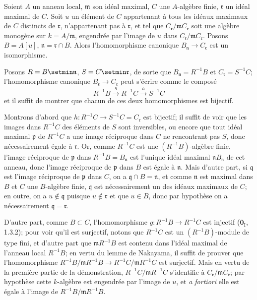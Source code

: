 \begin{lemma}[18.4.6.1]
\label{IV.18.4.6.1}
Soient $A$ un anneau local, $\mathfrak m$ son idéal maximal, $C$ une $A$-algèbre finie, $\mathfrak r$ un idéal maximal de $C$. Soit $u$ un élément de $C$ appartenant à tous les idéaux maximaux de $C$ distincts de $\mathfrak r$, n'appartenant pas à $\mathfrak r$, et tel que $C_{\mathfrak r}/\mathfrak mC_{\mathfrak r}$ soit une algèbre monogène sur $k=A/\mathfrak m$, engendrée par l'image de $u$ dans $C_{\mathfrak r}/\mathfrak mC_{\mathfrak r}$. Posons $B=A[u]$, $\mathfrak n=\mathfrak r\cap B$. Alors l'homomorphisme canonique $B_{\mathfrak n}\to C_{\mathfrak r}$ est un isomorphisme.
\end{lemma}

Posons $R=B\setmin\mathfrak n$, $S=C\setmin\mathfrak r$, de sorte que $B_{\mathfrak n}=R^{-1}B$ et $C_{\mathfrak r}=S^{-1}C$; l'homomorphisme canonique $B_{\mathfrak r}\to C_{\mathfrak r}$ peut s'écrire comme le composé
\[
  R^{-1}B\xrightarrow{g}R^{-1}C\xrightarrow{h}S^{-1}C
\]
et il suffit de montrer que chacun de ces deux homomorphismes est bijectif.

Montrons d'abord que $h:R^{-1}C\to S^{-1}C=C_{\mathfrak r}$ est bijectif; il suffit de voir que les images dans $R^{-1}C$ des éléments de $S$ sont inversibles, ou encore que tout idéal maximal $\mathfrak p$ de $R^{-1}C$ a une image réciproque dans $C$ ne rencontrant pas $S$, donc nécessairement égale à $\mathfrak r$. Or, comme $R^{-1}C$ est une $(R^{-1}B)$-algèbre finie, l'image réciproque de $\mathfrak p$ dans
$R^{-1}B=B_{\mathfrak n}$ est l'unique idéal maximal $\mathfrak nB_{\mathfrak n}$ de cet anneau, donc l'image réciproque de $\mathfrak p$ dans $B$ est égale à $\mathfrak n$. Mais d'autre part, si $\mathfrak q$ est l'image réciproque de $\mathfrak p$ dans $C$, on a $\mathfrak q\cap B=\mathfrak n$, et comme $\mathfrak n$ est maximal dans $B$ et $C$ une $B$-algèbre finie, $\mathfrak q$ est nécessairement un des idéaux maximaux de $C$; en outre, on a $u\notin\mathfrak q$ puisque $u\notin\mathfrak r$ et que $u\in B$, donc par hypothèse on a nécessairement $\mathfrak q=\mathfrak r$.

D'autre part, comme $B\subset C$, l'homomorphisme $g:R^{-1}B\to R^{-1}C$ est injectif ($\mathbf{0}_{\mathrm I}$, 1.3.2); pour voir qu'il est surjectif, notons que $R^{-1}C$ est un $(R^{-1}B)$-module de type fini, et d'autre part que $\mathfrak mR^{-1}B$ est contenu dans l'idéal maximal de l'anneau local $R^{-1}B$; en vertu du lemme de Nakayama, il suffit de prouver que l'homomorphisme $R^{-1}B/\mathfrak mR^{-1}B\to R^{-1}C/\mathfrak mR^{-1}C$ est surjectif. Mais en vertu de la première partie de la démonstration, $R^{-1}C/\mathfrak mR^{-1}C$ s'identifie à $C_{\mathfrak r}/\mathfrak mC_{\mathfrak r}$; par hypothèse cette $k$-algèbre est engendrée par l'image de $u$, et \emph{a fortiori} elle est égale à l'image de $R^{-1}B/\mathfrak mR^{-1}B$.

